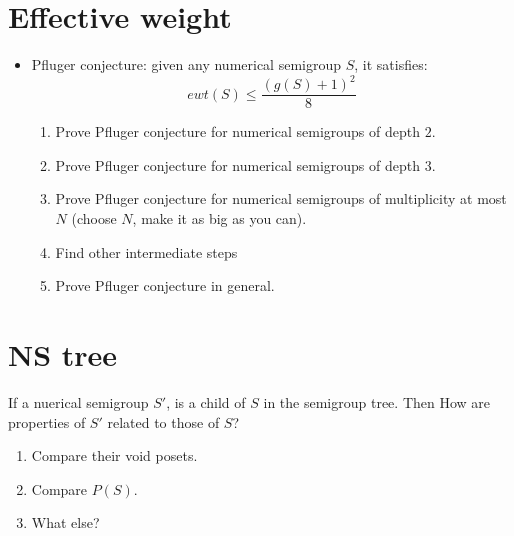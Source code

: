 \documentclass{article}
\theoremstyle{definition}
\theoremstyle{definition}
\theoremstyle{definition}
\begin{document}
\section{Effective weight}

\begin{itemize}
    \item Pfluger conjecture: given any numerical semigroup $S$, it satisfies:
    \[ewt(S)\leq \frac{(g(S)+1)^2}{8}\]
    \begin{enumerate}
        \item Prove Pfluger conjecture for numerical semigroups of depth $2$.
        \item Prove Pfluger conjecture for numerical semigroups of depth $3$.
        \item Prove Pfluger conjecture for numerical semigroups of multiplicity at most $N$ (choose $N$, make it as big as you can).
        \item Find other intermediate steps
        \item Prove Pfluger conjecture in general.
    \end{enumerate}
\end{itemize}

\section{NS tree}

If a nuerical semigroup $S'$, is a child of $S$ in the semigroup tree. Then How are properties of $S'$ related to those of $S$?
\begin{enumerate}
    \item Compare their void posets.
    \item Compare $P(S)$.
    \item What else?
\end{enumerate}
\end{document}
